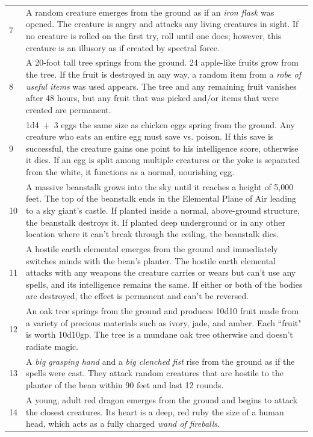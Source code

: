 \begin{longtable}{|p{}|p{}|}
\rowcolor[gray]{0.9}7	& A random creature emerges from the ground as if an \textit{iron flask} was opened.  The creature is angry and attacks any living creatures in sight.  If no creature is rolled on the first try, roll until one does; however, this creature is an illusory as if created by spectral force. \\
8	& A 20-foot tall tree springs from the ground.  24 apple-like fruits grow from the tree.  If the fruit is destroyed in any way, a random item from a \textit{robe of useful items} was used appears.  The tree and any remaining fruit vanishes after 48 hours, but any fruit that was picked and/or items that were created are permanent. \\
\rowcolor[gray]{0.9}9	& 1d4~+~3 eggs the same size as chicken eggs spring from the ground.  Any creature who eats an entire egg must save vs. poison.  If this save is successful, the creature gains one point to his intelligence score, otherwise it dies.  If an egg is split among multiple creatures or the yoke is separated from the white, it functions as a normal, nourishing egg. \\
10	& A massive beanstalk grows into the sky until it reaches a height of 5,000 feet.  The top of the beanstalk ends in the Elemental Plane of Air leading to a sky giant's castle.  If planted inside a normal, above-ground structure, the beanstalk destroys it.  If planted deep underground or in any other location where it can't break through the ceiling, the beanstalk dies. \\
\rowcolor[gray]{0.9}11	& A hostile earth elemental emerges from the ground and immediately switches minds with the bean's planter.  The hostile earth elemental attacks with any weapons the creature carries or wears but can't use any spells, and its intelligence remains the same.  If either or both of the bodies are destroyed, the effect is permanent and can't be reversed. \\
12	& An oak tree springs from the ground and produces 10d10 fruit made from a variety of precious materials such as ivory, jade, and amber.  Each ``fruit" is worth 10d10gp.  The tree is a mundane oak tree otherwise and doesn't radiate magic. \\
\rowcolor[gray]{0.9}13	& A \textit{big grasping hand} and a \textit{big clenched fist} rise from the ground as if the spells were cast.  They attack random creatures that are hostile to the planter of the bean within 90 feet and last 12 rounds. \\
14	& A young, adult red dragon emerges from the ground and begins to attack the closest creatures.  Its heart is a deep, red ruby the size of a human head, which acts as a fully charged \textit{wand of fireballs}. \\

\end{longtable}
